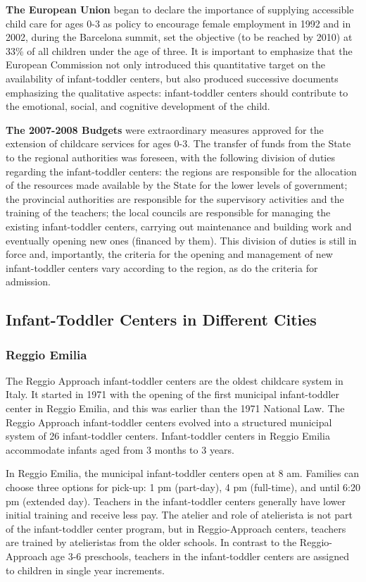 \textbf{The European Union} began to declare the importance of supplying accessible child care for ages 0-3 as policy to encourage female employment in 1992 and in 2002, during the Barcelona summit, set the objective (to be reached by 2010) at 33\% of all children under the age of three. It is important to emphasize that the European Commission not only introduced this quantitative target on the availability of infant-toddler centers, but also produced successive documents emphasizing the qualitative aspects: infant-toddler centers should contribute to the emotional, social, and cognitive development of the child. 

\textbf{The 2007-2008 Budgets} were extraordinary measures approved for the extension of childcare services for ages 0-3. The transfer of funds from the State to the regional authorities was foreseen, with the following division of duties regarding the infant-toddler centers: the regions are responsible for the allocation of the resources made available by the State for the lower levels of government; the provincial authorities are responsible for the supervisory activities and the training of the teachers; the local councils are responsible for managing the existing infant-toddler centers, carrying out maintenance and building work and eventually opening new ones (financed by them). This division of duties is still in force and, importantly, the criteria for the opening and management of new infant-toddler centers vary according to the region, as do the criteria for admission. 


\subsection{Infant-Toddler Centers in Different Cities}
\subsubsection{Reggio Emilia}
The Reggio Approach infant-toddler centers are the oldest childcare system in Italy. It started in 1971 with the opening of the first municipal infant-toddler center in Reggio Emilia, and this was earlier than the 1971 National Law. The Reggio Approach infant-toddler centers evolved into a structured municipal system of 26 infant-toddler centers. Infant-toddler centers in Reggio Emilia accommodate infants aged from 3 months to 3 years. 

In Reggio Emilia, the municipal infant-toddler centers open at 8 am. Families can choose three options for pick-up: 1 pm (part-day), 4 pm (full-time), and until 6:20 pm (extended day). Teachers in the infant-toddler centers generally have lower initial training and receive less pay. The atelier and role of atelierista is not part of the infant-toddler center program, but in Reggio-Approach centers, teachers are trained by atelieristas from the older schools. In contrast to the Reggio-Approach age 3-6 preschools, teachers in the infant-toddler centers are assigned to children in single year increments.  


